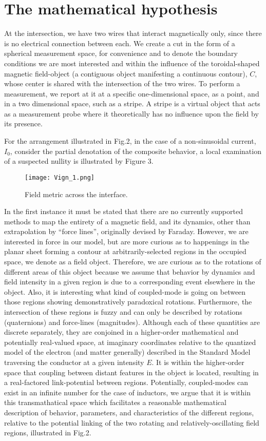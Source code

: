 \documentclass[]{article}
\begin{document}
\section{The mathematical hypothesis}
At the intersection, we have two wires that interact magnetically only, since there is no electrical connection between each. We create a cut in the form of a spherical measurement space, for convenience and to denote the boundary conditions we are most interested and within the influence of the toroidal-shaped magnetic field-object (a contiguous object manifesting a continuous contour), $C$, whose center is shared with the intersection of the two wires. To perform a measurement, we report at it at a specific one-dimensional space, as a point, and in a two dimensional space, such as a stripe. A stripe is a virtual object that acts as a measurement probe where it theoretically has no influence upon the field by its presence.

For the arrangement illustrated in Fig.2, in the case of a non-sinusoidal current, ${{I}_{0}}$, consider the partial denotation of the composite behavior, a local examination of a suspected nullity is illustrated by Figure 3.

\begin{figure}
  \texttt{[image: Vign\_1.png]}
  \caption{Field metric across the interface.}\label{fig:fig3}
\end{figure}

In the first instance it must be stated that there are no currently supported methods to map the entirety of a magnetic field, and its dynamics, other than extrapolation by “force lines”, originally devised by Faraday. However, we are interested in force in our model, but are more curious as to happenings in the planar sheet forming a contour at arbitrarily-selected regions in the occupied space, we denote as a field object. Therefore, we are curious as to the rotations of different areas of this object because we assume that behavior by dynamics and field intensity in a given region is due to a corresponding event elsewhere in the object. Also, it is interesting what kind of coupled-mode is going on between those regions showing demonstratively paradoxical rotations. Furthermore, the intersection of these regions is fuzzy and can only be described by rotations (quaternions) and force-lines (magnitudes). Although each of these quantities are discrete separately, they are conjoined in a higher-order  mathematical and potentially real-valued space, at imaginary coordinates relative to the quantized model of the electron (and matter generally) described in the Standard Model traversing the conductor at a given intensity $E$. It is within the higher-order space that coupling between distant features in the object is located, resulting in a real-factored link-potential between regions. Potentially, coupled-modes can exist in an infinite number for the case of inductors, we argue that it is within this transmathatical space which facilitates a reasonable mathematical description of behavior, parameters, and characteristics of the different regions, relative to the potential linking of the two rotating and relatively-oscillating field regions, illustrated in Fig.2.
\end{document}
